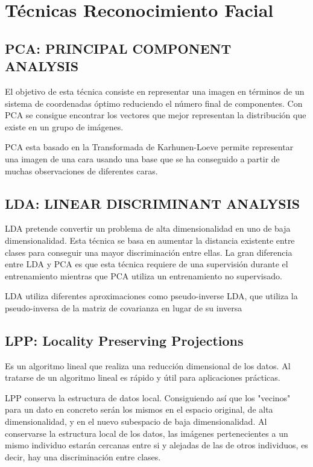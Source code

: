 \documentclass[a4paper,11pt]{book}
\begin{document}
\section{Técnicas Reconocimiento Facial }

\subsection{PCA: PRINCIPAL COMPONENT ANALYSIS}

El objetivo de esta técnica consiste en representar una imagen en términos de un
sistema de coordenadas óptimo reduciendo el número final de componentes. Con PCA se consigue encontrar los vectores que mejor representan la distribución que existe en un grupo de imágenes. 

PCA esta basado en la Transformada de Karhunen-Loeve\cite{loeve}  permite representar una imagen de una cara usando una base que se ha conseguido a partir de muchas observaciones de diferentes caras. 

\subsection{LDA: LINEAR DISCRIMINANT ANALYSIS}

LDA pretende convertir un problema de alta dimensionalidad en uno de baja
dimensionalidad. Esta técnica se basa en aumentar la distancia existente entre clases para conseguir una mayor discriminación entre ellas.\cite{pIborra}
La gran diferencia entre LDA y PCA es que esta técnica requiere de una supervisión durante el entrenamiento mientras que PCA utiliza un entrenamiento no supervisado.

LDA utiliza diferentes aproximaciones como pseudo-inverse LDA\cite{ravi}, que utiliza la pseudo-inversa de la matriz de covarianza en lugar de su inversa

\subsection{LPP: Locality Preserving Projections}

Es un algoritmo lineal que realiza una reducción dimensional de los datos. Al tratarse de un algoritmo lineal es rápido y útil para aplicaciones prácticas. 

LPP\cite{he} conserva la estructura de datos local.  Consiguiendo así que los "vecinos" para un dato en concreto serán los mismos en el espacio original, de alta dimensionalidad, y en el nuevo subespacio de baja dimensionalidad. Al conservarse la estructura local de los datos, las
imágenes pertenecientes a un mismo individuo estarán cercanas entre si y
alejadas de las de otros individuos, es decir, hay una discriminación entre
clases. 
\end{document}
